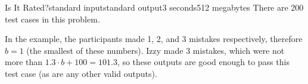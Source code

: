 \begin{problem}{Is It Rated?}{standard input}{standard output}{3 seconds}{512 megabytes}
There are 200 test cases in this problem.

\Example

\begin{example}
%
\end{example}

\Note
In the example, the participants made 1, 2, and 3 mistakes respectively, therefore $b=1$ (the smallest of these numbers). Izzy made 3 mistakes, which were not more than $1.3\cdot b + 100=101.3$, so these outputs are good enough to pass this test case (as are any other valid outputs).

\end{problem}

